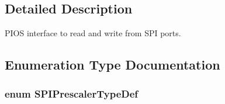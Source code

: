 \subsection{Detailed Description}
P\-I\-O\-S interface to read and write from S\-P\-I ports. 

\subsection{Enumeration Type Documentation}
\hypertarget{group___p_i_o_s___s_p_i_gacc2b1ca1c7cd8aeef04fee955ef7ffd2}{
\subsubsection[{S\-P\-I\-Prescaler\-Type\-Def}]{\setlength{\rightskip}{0pt plus 5cm}enum {\bf S\-P\-I\-Prescaler\-Type\-Def}}}\label{group___p_i_o_s___s_p_i_gacc2b1ca1c7cd8aeef04fee955ef7ffd2}

